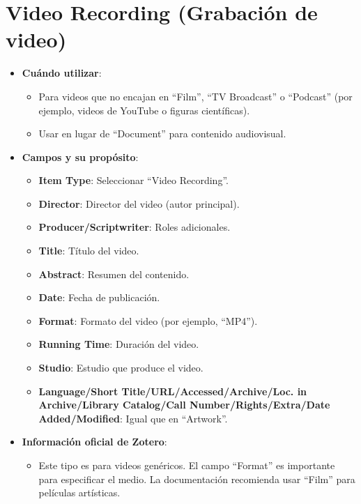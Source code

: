\documentclass[
  jou,
  floatsintext,
  longtable,
  a4paper,
  nolmodern,
  notxfonts,
  notimes,
  12pt,
  colorlinks=true,linkcolor=blue,citecolor=blue,urlcolor=blue]{apa7}
\providecommand{\tightlist}{%
  \setlength{\itemsep}{0pt}\setlength{\parskip}{0pt}}
\begin{document}
\section{Video Recording (Grabación de
video)}\label{video-recording-grabaciuxf3n-de-video}

\begin{itemize}
\tightlist
\item
  \textbf{Cuándo utilizar}:

  \begin{itemize}
  \tightlist
  \item
    Para videos que no encajan en ``Film'', ``TV Broadcast'' o
    ``Podcast'' (por ejemplo, videos de YouTube o figuras científicas).
  \item
    Usar en lugar de ``Document'' para contenido audiovisual.
  \end{itemize}
\item
  \textbf{Campos y su propósito}:

  \begin{itemize}
  \tightlist
  \item
    \textbf{Item Type}: Seleccionar ``Video Recording''.
  \item
    \textbf{Director}: Director del video (autor principal).
  \item
    \textbf{Producer/Scriptwriter}: Roles adicionales.
  \item
    \textbf{Title}: Título del video.
  \item
    \textbf{Abstract}: Resumen del contenido.
  \item
    \textbf{Date}: Fecha de publicación.
  \item
    \textbf{Format}: Formato del video (por ejemplo, ``MP4'').
  \item
    \textbf{Running Time}: Duración del video.
  \item
    \textbf{Studio}: Estudio que produce el video.
  \item
    \textbf{Language/Short Title/URL/Accessed/Archive/Loc. in
    Archive/Library Catalog/Call Number/Rights/Extra/Date
    Added/Modified}: Igual que en ``Artwork''.
  \end{itemize}
\item
  \textbf{Información oficial de Zotero}:

  \begin{itemize}
  \tightlist
  \item
    Este tipo es para videos genéricos. El campo ``Format'' es
    importante para especificar el medio. La documentación recomienda
    usar ``Film'' para películas artísticas.
  \end{itemize}
\end{itemize}
\end{document}

